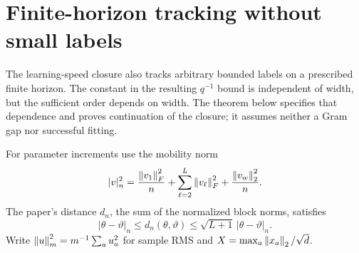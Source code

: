 \section{Finite-horizon tracking without small labels}
\label{app:finite-time-uniform}

The learning-speed closure also tracks arbitrary bounded labels on a
prescribed finite horizon.  The constant in the resulting $q^{-1}$ bound
is independent of width, but the sufficient order depends on width.
The theorem below specifies that dependence and proves continuation of the
closure; it assumes neither a Gram gap nor successful fitting.

For parameter increments use the mobility norm
\begin{equation}
 |v|_n^2=\frac{\left\lVert v_1\right\rVert_F^2}{n}
       +\sum_{\ell=2}^L\left\lVert v_\ell\right\rVert_F^2
       +\frac{\left\lVert v_w\right\rVert_2^2}{n}.
 \label{eq:ft-metric}
\end{equation}
The paper's distance $d_n$, the sum of the normalized block norms,
satisfies
\[
 |\theta-\vartheta|_n\le d_n(\theta,\vartheta)
       \le\sqrt{L+1}\,|\theta-\vartheta|_n.
\]
Write $\left\lVert u\right\rVert_m^2=m^{-1}\sum_a u_a^2$ for sample RMS and
$X=\max_a\left\lVert x_a\right\rVert_2/\sqrt d$.

